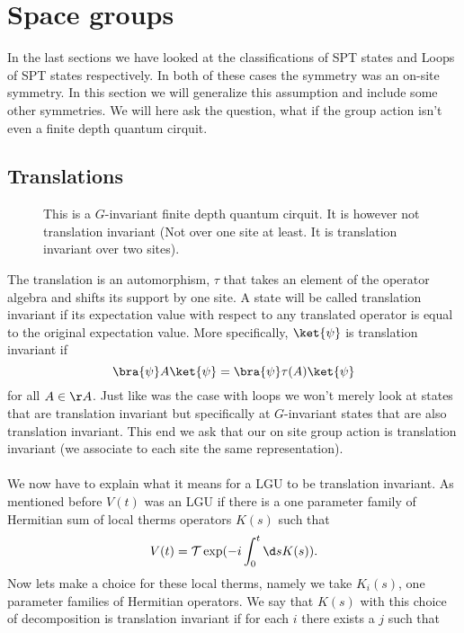 \section{Space groups}
In the last sections we have looked at the classifications of SPT states and Loops of SPT states respectively. In both of these cases the symmetry was an on-site symmetry. In this section we will generalize this assumption and include some other symmetries. We will here ask the question, what if the group action isn't even a finite depth quantum cirquit.
\subsection{Translations}
\begin{figure}
	\scalebox{0.7}{
		
	}
	\caption{This is a $G$-invariant finite depth quantum cirquit. It is however not translation invariant (Not over one site at least. It is translation invariant over two sites).}
	\label{fig:Z_2_and_TranslationInvariantStates}
\end{figure}
The translation is an automorphism, $\tau$ that takes an element of the operator algebra and shifts its support by one site. A state will be called translation invariant if its expectation value with respect to any translated operator is equal to the original expectation value. More specifically, $\ket{\psi}$ is translation invariant if
\begin{equation}
\bra{\psi}A\ket{\psi}=\bra{\psi}\tau(A)\ket{\psi}
\end{equation}
for all $A\in\AA$. Just like was the case with loops we won't merely look at states that are translation invariant but specifically at $G$-invariant states that are also translation invariant. This end we ask that our on site group action is translation invariant (we associate to each site the same representation).\\\\
We now have to explain what it means for a LGU to be translation invariant. As mentioned before $V(t)$ was an LGU if there is a one parameter family of Hermitian sum of local therms operators $K(s)$ such that
\begin{equation}
V(t)=\mathcal{T}\exp(-i\int_{0}^{t}\d s K(s)).
\end{equation}
Now lets make a choice for these local therms, namely we take $K_i(s)$, one parameter families of Hermitian operators. We say that $K(s)$ with this choice of decomposition is translation invariant if for each $i$ there exists a $j$ such that
